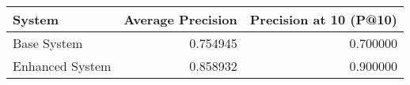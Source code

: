\begin{tabular}{lrr}
\toprule
System & Average Precision & Precision at 10 (P@10) \\
\midrule
Base System & 0.754945 & 0.700000 \\
Enhanced System & 0.858932 & 0.900000 \\
\bottomrule
\end{tabular}
